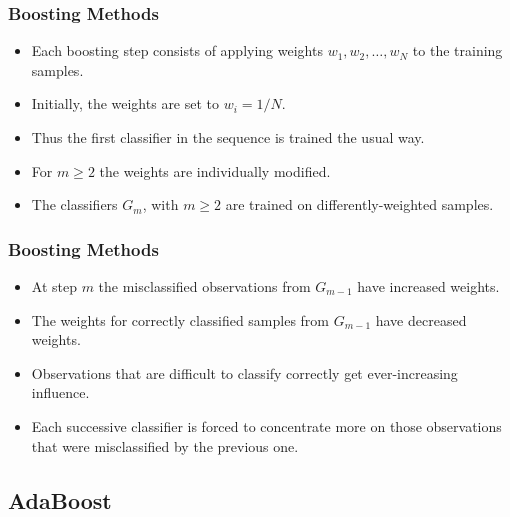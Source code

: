 \begin{frame}
  \frametitle{Boosting Methods \cont}


  \begin{itemize}
    \item Each boosting step consists of applying weights $w_1, w_2, \ldots, w_N$ to the training samples. %
    \item Initially, the weights are set to $w_i = 1/N$. %
    \item Thus the first classifier in the sequence is trained the usual way. %
    \item For $m \geq 2$ the weights are individually modified. %
    \item The classifiers $G_m$, with $m \geq 2$ are trained on differently-weighted samples.
  \end{itemize}
\end{frame}


\begin{frame}
  \frametitle{Boosting Methods}


  \begin{itemize}
    \item At step $m$ the misclassified observations from $G_{m-1}$ have increased weights.
    \item The weights for correctly classified samples from $G_{m-1}$ have decreased weights.
  \end{itemize}
  \pspread


  \begin{itemize}
    \item Observations that are difficult to classify correctly get ever-increasing influence.
    \item Each successive classifier is forced to concentrate more on those observations that were misclassified by the previous one.
  \end{itemize}
\end{frame}


\subsection{AdaBoost}

